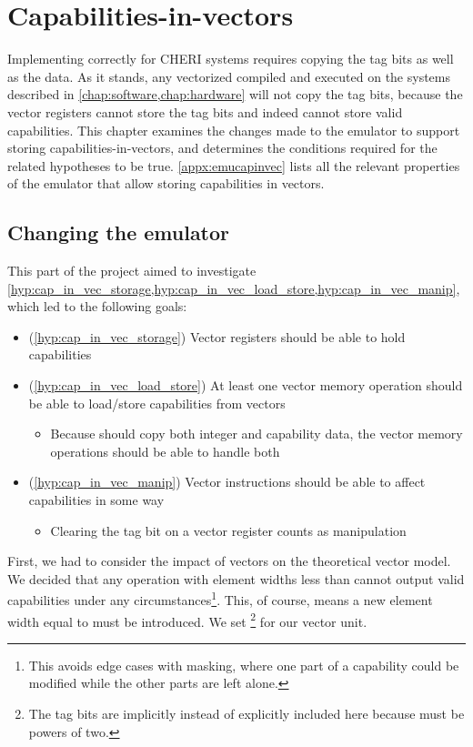 \chapter{Capabilities-in-vectors\label{chap:capinvec}}
Implementing  correctly for CHERI systems requires copying the tag bits as well as the data.
As it stands, any vectorized  compiled and executed on the systems described in \cref{chap:software,chap:hardware} will not copy the tag bits, because the vector registers cannot store the tag bits and indeed cannot store valid capabilities.
This chapter examines the changes made to the emulator to support storing capabilities-in-vectors, and determines the conditions required for the related hypotheses to be true.
\cref{appx:emucapinvec} lists all the relevant properties of the emulator that allow storing capabilities in vectors.

\section{Changing the emulator}
This part of the project aimed to investigate \cref{hyp:cap_in_vec_storage,hyp:cap_in_vec_load_store,hyp:cap_in_vec_manip}, which led to the following goals:
\begin{itemize}
    \item (\cref{hyp:cap_in_vec_storage}) Vector registers should be able to hold capabilities 
    \item (\cref{hyp:cap_in_vec_load_store}) At least one vector memory operation should be able to load/store capabilities from vectors
    \begin{itemize}
        \item Because  should copy both integer and capability data, the vector memory operations should be able to handle both
    \end{itemize}
    \item (\cref{hyp:cap_in_vec_manip}) Vector instructions should be able to affect capabilities in some way
    \begin{itemize}
        \item Clearing the tag bit on a vector register counts as manipulation
    \end{itemize}
\end{itemize}

First, we had to consider the impact of vectors on the theoretical vector model.
We decided that any operation with element widths less than  cannot output valid capabilities under any circumstances\footnote{This avoids edge cases with masking, where one part of a capability could be modified while the other parts are left alone.}.
This, of course, means a new element width equal to  must be introduced.
We set \footnote{The tag bits are implicitly instead of explicitly included here because  must be powers of two.} for our vector unit.

